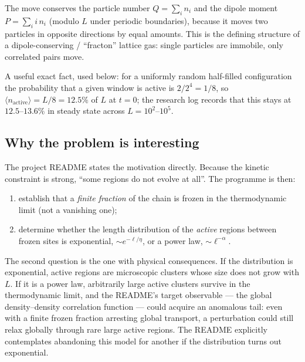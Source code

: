 \documentclass[11pt,a4paper]{article}
\begin{document}
The move conserves the particle number $Q=\sum_i n_i$ and the dipole moment
$P=\sum_i i\,n_i$ (modulo $L$ under periodic boundaries), because it moves
two particles in opposite directions by equal amounts. This is the defining
structure of a dipole-conserving / ``fracton'' lattice gas: single particles
are immobile, only correlated pairs move.

A useful exact fact, used below: for a uniformly random half-filled
configuration the probability that a given window is active is
$2/2^4=1/8$, so $\langle n_{\text{active}}\rangle=L/8=12.5\%$ of $L$ at
$t=0$; the research log records that this stays at $12.5$--$13.6\%$ in
steady state across $L=10^2$--$10^5$.

\subsection{Why the problem is interesting}
The project README states the motivation directly. Because the kinetic
constraint is strong, ``some regions do not evolve at all''. The programme
is then:
\begin{enumerate}
\item establish that a \emph{finite fraction} of the chain is frozen in the
thermodynamic limit (not a vanishing one);
\item determine whether the length distribution of the \emph{active} regions
between frozen sites is exponential, $\sim e^{-\ell/\eta}$, or a power law,
$\sim \ell^{-\alpha}$.
\end{enumerate}
The second question is the one with physical consequences. If the
distribution is exponential, active regions are microscopic clusters whose
size does not grow with $L$. If it is a power law, arbitrarily large active
clusters survive in the thermodynamic limit, and the README's target
observable --- the global density--density correlation function --- could
acquire an anomalous tail: even with a finite frozen fraction arresting
global transport, a perturbation could still relax globally through rare
large active regions. The README explicitly contemplates abandoning this
model for another if the distribution turns out exponential.
\end{document}

